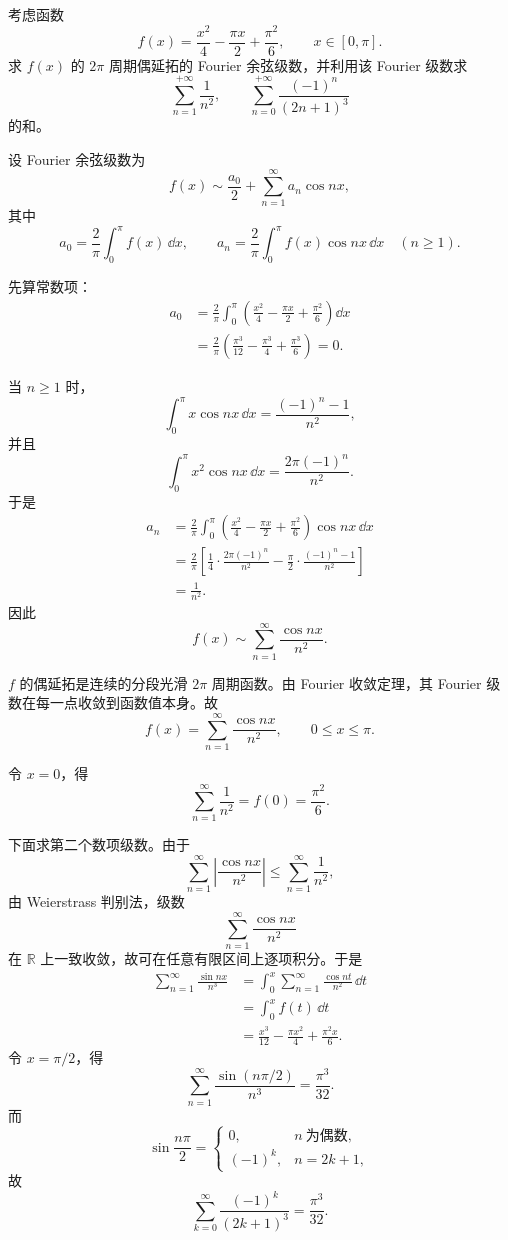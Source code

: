 \begin{question}[20分]
考虑函数
\[
  f(x)=\frac{x^2}{4}-\frac{\pi x}{2}+\frac{\pi^2}{6},
  \qquad x\in[0,\pi].
\]
求 $f(x)$ 的 $2\pi$ 周期偶延拓的 Fourier 余弦级数，并利用该 Fourier 级数求
\[
  \sum_{n=1}^{+\infty}\frac1{n^2},
  \qquad
  \sum_{n=0}^{+\infty}\frac{(-1)^n}{(2n+1)^3}
\]
的和。
\begin{solution}
设 Fourier 余弦级数为
\[
  f(x)\sim \frac{a_0}{2}+\sum_{n=1}^{\infty}a_n\cos nx,
\]
其中
\[
  a_0=\frac2\pi\int_0^\pi f(x)\,\dd x,
  \qquad
  a_n=\frac2\pi\int_0^\pi f(x)\cos nx\,\dd x
  \quad(n\ge1).
\]

先算常数项：
\[
\begin{aligned}
  a_0
  &=\frac2\pi\int_0^\pi
  \left(\frac{x^2}{4}-\frac{\pi x}{2}+\frac{\pi^2}{6}\right)\dd x  \\
  &=\frac2\pi\left(\frac{\pi^3}{12}-\frac{\pi^3}{4}+\frac{\pi^3}{6}\right)=0.
\end{aligned}
\]

当 $n\ge1$ 时，
\[
  \int_0^\pi x\cos nx\,\dd x=\frac{(-1)^n-1}{n^2},
\]
并且
\[
  \int_0^\pi x^2\cos nx\,\dd x=\frac{2\pi(-1)^n}{n^2}.
\]
于是
\[
\begin{aligned}
  a_n
  &=\frac2\pi\int_0^\pi
  \left(\frac{x^2}{4}-\frac{\pi x}{2}+\frac{\pi^2}{6}\right)\cos nx\,\dd x  \\
  &=\frac2\pi\left[
    \frac14\cdot\frac{2\pi(-1)^n}{n^2}
    -\frac\pi2\cdot\frac{(-1)^n-1}{n^2}
  \right]  \\
  &=\frac1{n^2}.
\end{aligned}
\]
因此
\[
  f(x)\sim \sum_{n=1}^{\infty}\frac{\cos nx}{n^2}.
\]

$f$ 的偶延拓是连续的分段光滑 $2\pi$ 周期函数。由 Fourier 收敛定理，其 Fourier 级数在每一点收敛到函数值本身。故
\[
  f(x)=\sum_{n=1}^{\infty}\frac{\cos nx}{n^2},
  \qquad 0\le x\le\pi.
\]

令 $x=0$，得
\[
  \sum_{n=1}^{\infty}\frac1{n^2}
  =f(0)=\frac{\pi^2}{6}.
\]

下面求第二个数项级数。由于
\[
  \sum_{n=1}^{\infty}\left|\frac{\cos nx}{n^2}\right|
  \le
  \sum_{n=1}^{\infty}\frac1{n^2},
\]
由 Weierstrass 判别法，级数
\[
  \sum_{n=1}^{\infty}\frac{\cos nx}{n^2}
\]
在 $\mathbb R$ 上一致收敛，故可在任意有限区间上逐项积分。于是
\[
\begin{aligned}
  \sum_{n=1}^{\infty}\frac{\sin nx}{n^3}
  &=
  \int_0^x\sum_{n=1}^{\infty}\frac{\cos nt}{n^2}\,\dd t  \\
  &=
  \int_0^x f(t)\,\dd t  \\
  &=
  \frac{x^3}{12}-\frac{\pi x^2}{4}+\frac{\pi^2x}{6}.
\end{aligned}
\]
令 $x=\pi/2$，得
\[
  \sum_{n=1}^{\infty}\frac{\sin(n\pi/2)}{n^3}
  =\frac{\pi^3}{32}.
\]
而
\[
  \sin\frac{n\pi}{2}
  =
  \begin{cases}
    0, & n\ \text{为偶数},\\
    (-1)^k, & n=2k+1,
  \end{cases}
\]
故
\[
  \sum_{k=0}^{\infty}\frac{(-1)^k}{(2k+1)^3}
  =\frac{\pi^3}{32}.
\]


\end{solution}
\end{question}
